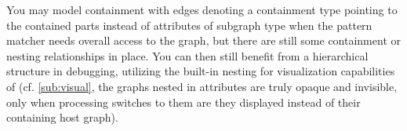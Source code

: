 You may model containment with edges denoting a containment type pointing to the contained parts instead of attributes of subgraph type
when the pattern matcher needs overall access to the graph, but there are still some containment or nesting relationships in place.
You can then still benefit from a hierarchical structure in debugging, utilizing the built-in nesting for visualization capabilities of \GrG (cf. \ref{sub:visual}, the graphs nested in attributes are truly opaque and invisible, only when processing switches to them are they displayed instead of their containing host graph).

